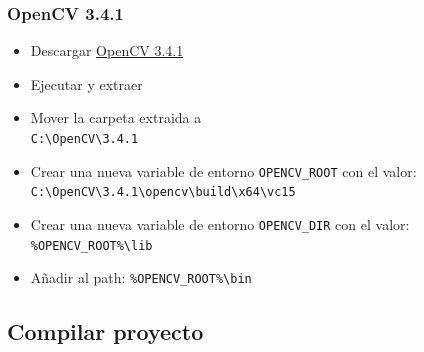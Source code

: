 \subsubsection{OpenCV 3.4.1}

\begin{itemize}	
	\item Descargar \href{https://sourceforge.net/projects/opencvlibrary/files/opencv-win/3.4.1/opencv-3.4.1-vc14_vc15.exe/download}{OpenCV 3.4.1}
	\item Ejecutar y extraer
	\item Mover la carpeta extraida a \\ \texttt{C:\textbackslash OpenCV\textbackslash 3.4.1}
	\item Crear una nueva variable de entorno \texttt{OPENCV\_ROOT} con el valor: \\ \texttt{C:\textbackslash OpenCV\textbackslash 3.4.1\textbackslash opencv\textbackslash build\textbackslash x64\textbackslash vc15}
	\item Crear una nueva variable de entorno \texttt{OPENCV\_DIR} con el valor: \\ \texttt{\%OPENCV\_ROOT\%\textbackslash lib}
	\item Añadir al path: \texttt{\%OPENCV\_ROOT\%\textbackslash bin}
\end{itemize}

\subsection{Compilar proyecto}

